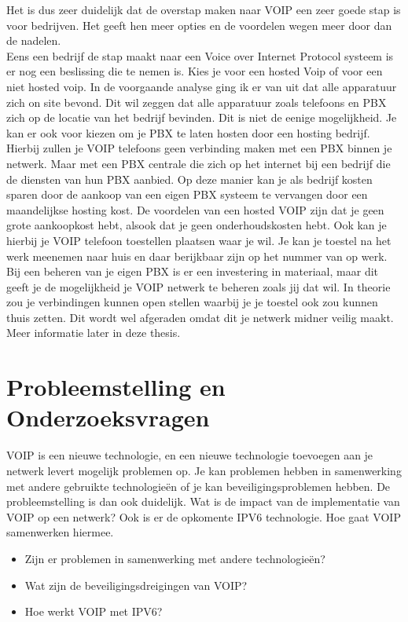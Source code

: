\documentclass[pdftex,a4paper,12pt,twoside]{report}
\begin{document}
Het is dus zeer duidelijk dat de overstap maken naar VOIP een zeer goede stap is voor bedrijven. Het geeft hen meer opties en de voordelen wegen meer door dan de nadelen. \\
Eens een bedrijf de stap maakt naar een Voice over Internet Protocol systeem is er nog een beslissing die te nemen is. Kies je voor een hosted Voip of voor een niet hosted voip.
In de voorgaande analyse ging ik er van uit dat alle apparatuur zich on site bevond. Dit wil zeggen dat alle apparatuur zoals telefoons en PBX zich op de locatie van het bedrijf bevinden.
Dit is niet de eenige mogelijkheid. Je kan er ook voor kiezen om je PBX te laten hosten door een hosting bedrijf. Hierbij zullen je VOIP telefoons geen verbinding maken met een PBX binnen je netwerk.
Maar met een PBX centrale die zich op het internet bij een bedrijf die de diensten van hun PBX aanbied. Op deze manier kan je als bedrijf kosten sparen door de aankoop van een eigen PBX systeem te vervangen door een maandelijkse hosting kost.
De voordelen van een hosted VOIP zijn dat je geen grote aankoopkost hebt, alsook dat je geen onderhoudskosten hebt. Ook kan je hierbij je VOIP telefoon toestellen plaatsen waar je wil. Je kan je toestel na het werk meenemen naar huis en daar berijkbaar zijn op het nummer van op werk.
Bij een beheren van je eigen PBX is er een investering in materiaal, maar dit geeft je de mogelijkheid je VOIP netwerk te beheren zoals jij dat wil. In theorie zou je verbindingen kunnen open stellen waarbij je je toestel ook zou kunnen thuis zetten. Dit wordt wel afgeraden omdat dit je netwerk midner veilig maakt. Meer informatie later in deze thesis.

\newpage

\section{Probleemstelling en Onderzoeksvragen}
\label{sec:onderzoeksvragen}
VOIP is een nieuwe technologie, en een nieuwe technologie toevoegen aan je netwerk levert mogelijk problemen op. Je kan problemen hebben in samenwerking met andere gebruikte technologieën of je kan beveiligingsproblemen hebben. De probleemstelling is dan ook duidelijk. Wat is de impact van de implementatie van VOIP op een netwerk? Ook is er de opkomente IPV6 technologie. Hoe gaat VOIP samenwerken hiermee.

\begin{itemize}
	\item Zijn er problemen in samenwerking met andere technologieën?
	\item Wat zijn de beveiligingsdreigingen van VOIP?
	\item Hoe werkt VOIP met IPV6?
\end{itemize}
\end{document}
